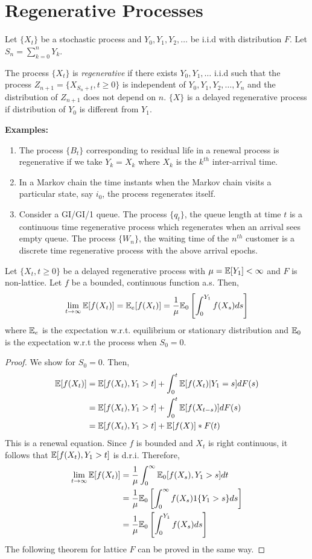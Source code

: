 \documentclass[all-lectures.tex]{subfiles}
\begin{document}
\section{Regenerative Processes}
Let $\{X_t\}$ be a stochastic process and $Y_0,Y_1,Y_2,\dots$ be i.i.d with distribution $F$. Let $S_n = \sum_{k=0}^n Y_k$.
\begin{defn}
The process $\{X_t\}$ is \textit{regenerative }if there exists $Y_0,Y_1,\dots$ i.i.d such that the process $Z_{n+1} = \{X_{S_n +t}, t\geq 0\}$ is independent of $Y_0,Y_1,Y_2,\dots,Y_n$ and the distribution of $Z_{n+1}$ does not depend on $n$. $\{X\}$ is a delayed regenerative process if distribution of $Y_0$ is different from $Y_1$.
\end{defn}
\indent \textbf{Examples:} 
\begin{enumerate}
\item The process $\{B_t\}$ corresponding to residual life in a renewal process is regenerative if we take $Y_k = X_k$ where $X_k$ is the $k^{th}$ inter-arrival time.
\item In a Markov chain the time instants when the Markov chain visits a particular state, say $i_0$, the process regenerates itself. 
\item Consider a GI/GI/1 queue. The process $\{q_t\}$, the queue length at time $t$ is a continuous time regenerative process which regenerates when an arrival sees empty queue. The process $\{W_n\}$, the waiting time of the $n^{th}$ customer is a discrete time regenerative process with the above arrival epochs. 
\end{enumerate} 
\begin{thm}
Let $\{X_t,t\geq 0\}$ be a delayed regenerative process with $\mu = \mathbb{E}[Y_1] < \infty$ and $F$ is non-lattice. Let $f$ be a bounded,  continuous function a.s. Then,
\begin{align*}
\lim_{t\to \infty} \mathbb{E}[f(X_t)] = \mathbb{E}_e[f(X_t)] = \frac{1}{\mu} \mathbb{E}_0\left[ \int_0^{Y_1} f(X_s) ds\right]
\end{align*}
where $\mathbb{E}_e$ is the expectation w.r.t. equilibrium or stationary distribution and $\mathbb{E}_0$ is the expectation w.r.t the process when $S_0 = 0$.
\begin{proof} We show for $S_0 = 0$. Then, 
\begin{align*}
\mathbb{E}[f(X_t)] &= \mathbb{E}[f(X_t), Y_1 > t] + \int_0^t \mathbb{E}[f(X_t)| Y_1 = s] dF(s) \\
&= \mathbb{E}[f(X_t), Y_1 > t] + \int_0^t \mathbb{E}[f(X_{t-s})] dF(s)\\
&= \mathbb{E}[f(X_t), Y_1 > t] + \mathbb{E}[f(X)]*F(t)
\end{align*}
This is a renewal equation. Since $f$ is bounded and $X_t$ is right continuous, it follows that $\mathbb{E}[f(X_t), Y_1 > t]$ is d.r.i. Therefore,
\begin{align*}
\lim_{t\to \infty} \mathbb{E}[f(X_t)] &= \frac{1}{\mu} \int_0^\infty \mathbb{E}_0[f(X_s), Y_1 >  s] dt\\
&= \frac{1}{\mu} \mathbb{E}_0\left[ \int_0^\infty f(X_s)1\{ Y_1 >  s\} ds\right]\\
&= \frac{1}{\mu} \mathbb{E}_0\left[ \int_0^{Y_1} f(X_s) ds\right] \qedhere
\end{align*}
The following theorem for lattice $F$ can be proved in the same way.
\newpage
\end{proof}
\end{thm}
\end{document}
